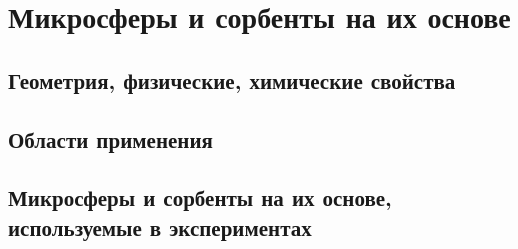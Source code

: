 \section{Микросферы и сорбенты на их основе}
\label{section_1_3}

\subsection{Геометрия, физические, химические свойства}
\label{section_1_3_1}

\subsection{Области применения}
\label{section_1_3_2}

\subsection{Микросферы и сорбенты на их основе, используемые в экспериментах}
\label{section_1_3_3}